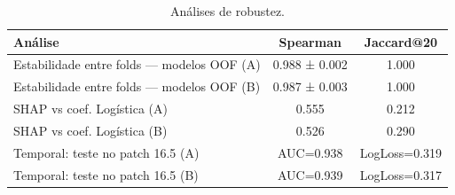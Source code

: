 \begin{table}[htbp]
\caption{Análises de robustez.}
\label{tab:robustez}
\centering
\small
\begin{tabular}{lcc}
\toprule
Análise & Spearman & Jaccard@20 \\
\midrule
Estabilidade entre folds — modelos OOF (A) & 0.988 ± 0.002 & 1.000 \\
Estabilidade entre folds — modelos OOF (B) & 0.987 ± 0.003 & 1.000 \\
SHAP vs coef. Logística (A) & 0.555 & 0.212 \\
SHAP vs coef. Logística (B) & 0.526 & 0.290 \\
Temporal: teste no patch 16.5 (A) & AUC=0.938 & LogLoss=0.319 \\
Temporal: teste no patch 16.5 (B) & AUC=0.939 & LogLoss=0.317 \\
\bottomrule
\end{tabular}
\end{table}
